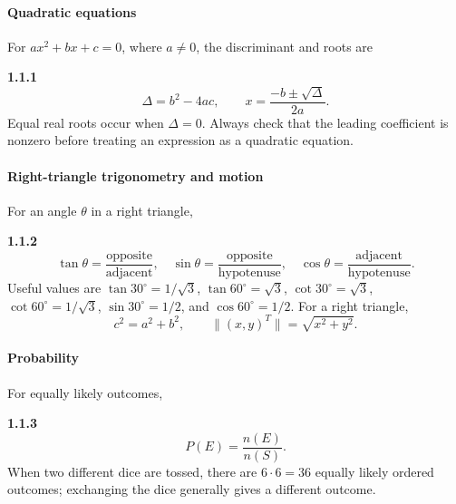 \renewcommand{\theenumii}{\thesubsection.\arabic{enumii}}
\setcounter{enumii}{1}\setcounter{equation}{0}

\paragraph*{Quadratic equations}
For $ax^2+bx+c=0$, where $a\ne0$, the discriminant and roots are

\par\noindent\textbf{1.1.1}\quad
\begin{equation}
\Delta=b^2-4ac,\qquad x=\frac{-b\pm\sqrt{\Delta}}{2a}.
\label{eq:quad-general}
\end{equation}
Equal real roots occur when $\Delta=0$. Always check that the leading coefficient is nonzero before treating an expression as a quadratic equation.


\setcounter{enumii}{2}\setcounter{equation}{0}
\paragraph*{Right-triangle trigonometry and motion}
For an angle $\theta$ in a right triangle,

\par\noindent\textbf{1.1.2}\quad
\begin{equation}
\tan\theta=\frac{\text{opposite}}{\text{adjacent}},\quad
\sin\theta=\frac{\text{opposite}}{\text{hypotenuse}},\quad
\cos\theta=\frac{\text{adjacent}}{\text{hypotenuse}}.
\label{eq:trig-ratios}
\end{equation}
Useful values are $\tan30^\circ=1/\sqrt3$, $\tan60^\circ=\sqrt3$, $\cot30^\circ=\sqrt3$, $\cot60^\circ=1/\sqrt3$, $\sin30^\circ=1/2$, and $\cos60^\circ=1/2$. For a right triangle,
\[c^2=a^2+b^2,\qquad \|(x,y)^T\|=\sqrt{x^2+y^2}.\]

\setcounter{enumii}{3}\setcounter{equation}{0}
\paragraph*{Probability}
For equally likely outcomes,

\par\noindent\textbf{1.1.3}\quad
\begin{equation}
P(E)=\frac{n(E)}{n(S)}.
\label{eq:prob-classical}
\end{equation}
When two different dice are tossed, there are $6\cdot6=36$ equally likely ordered outcomes; exchanging the dice generally gives a different outcome.

